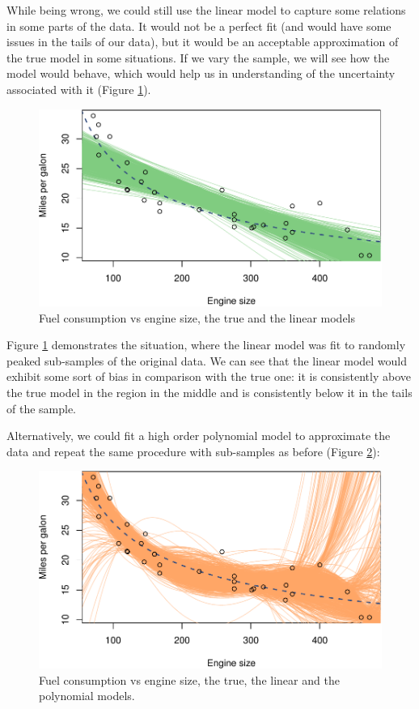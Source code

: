 \documentclass[
]{book}
\theoremstyle{definition}
\theoremstyle{definition}
\theoremstyle{definition}
\theoremstyle{definition}
\theoremstyle{remark}
\begin{document}
While being wrong, we could still use the linear model to capture some relations in some parts of the data. It would not be a perfect fit (and would have some issues in the tails of our data), but it would be an acceptable approximation of the true model in some situations. If we vary the sample, we will see how the model would behave, which would help us in understanding of the uncertainty associated with it (Figure \ref{fig:biasVariance03}).

\begin{figure}
\centering
\includegraphics{Svetunkov---Statistics-for-Business-Analytics_files/figure-latex/biasVariance03-1.pdf}
\caption{\label{fig:biasVariance03}Fuel consumption vs engine size, the true and the linear models}
\end{figure}

Figure \ref{fig:biasVariance03} demonstrates the situation, where the linear model was fit to randomly peaked sub-samples of the original data. We can see that the linear model would exhibit some sort of bias in comparison with the true one: it is consistently above the true model in the region in the middle and is consistently below it in the tails of the sample.

Alternatively, we could fit a high order polynomial model to approximate the data and repeat the same procedure with sub-samples as before (Figure \ref{fig:biasVariance04}):

\begin{figure}
\centering
\includegraphics{Svetunkov---Statistics-for-Business-Analytics_files/figure-latex/biasVariance04-1.pdf}
\caption{\label{fig:biasVariance04}Fuel consumption vs engine size, the true, the linear and the polynomial models.}
\end{figure}
\end{document}
